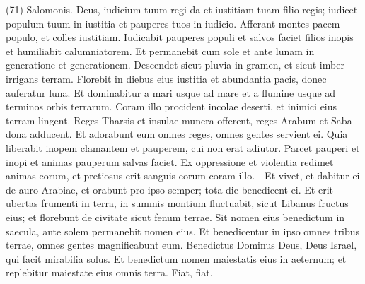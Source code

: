 \begin{biblechapter}  (71) 
\verse Salomonis. Deus, iudicium tuum regi da et iustitiam tuam filio regis; 
\verse iudicet populum tuum in iustitia et pauperes tuos in iudicio. 
\verse Afferant montes pacem populo, et colles iustitiam. 
\verse Iudicabit pauperes populi et salvos faciet filios inopis et humiliabit calumniatorem. 
\verse Et permanebit cum sole et ante lunam in generatione et generationem. 
\verse Descendet sicut pluvia in gramen, et sicut imber irrigans terram. 
\verse Florebit in diebus eius iustitia et abundantia pacis, donec auferatur luna. 
\verse Et dominabitur a mari usque ad mare et a flumine usque ad terminos orbis terrarum. 
\verse Coram illo procident incolae deserti, et inimici eius terram lingent. 
\verse Reges Tharsis et insulae munera offerent, reges Arabum et Saba dona adducent. 
\verse Et adorabunt eum omnes reges, omnes gentes servient ei. 
\verse Quia liberabit inopem clamantem et pauperem, cui non erat adiutor. 
\verse Parcet pauperi et inopi et animas pauperum salvas faciet. 
\verse Ex oppressione et violentia redimet animas eorum, et pretiosus erit sanguis eorum coram illo. - 
\verse Et vivet, et dabitur ei de auro Arabiae, et orabunt pro ipso semper; tota die benedicent ei. 
\verse Et erit ubertas frumenti in terra, in summis montium fluctuabit, sicut Libanus fructus eius; et florebunt de civitate sicut fenum terrae. 
\verse Sit nomen eius benedictum in saecula, ante solem permanebit nomen eius. Et benedicentur in ipso omnes tribus terrae, omnes gentes magnificabunt eum. 
\verse Benedictus Dominus Deus, Deus Israel, qui facit mirabilia solus. 
\verse Et benedictum nomen maiestatis eius in aeternum; et replebitur maiestate eius omnis terra. Fiat, fiat. 
\end{biblechapter}

\begin{biblechapter} 
\end{biblechapter}

